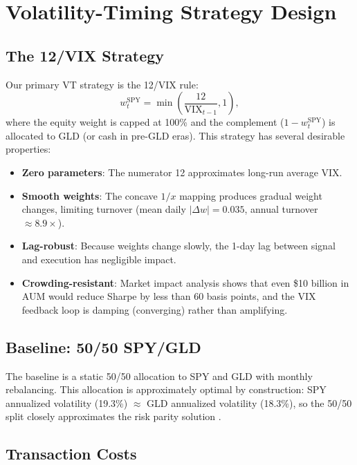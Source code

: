 \documentclass[12pt,a4paper]{article}
\begin{document}
\section{Volatility-Timing Strategy Design}
\label{sec:strategy}

\subsection{The 12/VIX Strategy}

Our primary VT strategy is the 12/VIX rule:
\begin{equation}
w_t^{\text{SPY}} = \min\left(\frac{12}{\text{VIX}_{t-1}}, 1\right),
\label{eq:12vix}
\end{equation}
where the equity weight is capped at 100\% and the complement ($1 - w_t^{\text{SPY}}$) is allocated to GLD (or cash in pre-GLD eras). This strategy has several desirable properties:
\begin{itemize}
    \item \textbf{Zero parameters}: The numerator 12 approximates long-run average VIX.
    \item \textbf{Smooth weights}: The concave $1/x$ mapping produces gradual weight changes, limiting turnover (mean daily $|\Delta w| = 0.035$, annual turnover $\approx 8.9\times$).
    \item \textbf{Lag-robust}: Because weights change slowly, the 1-day lag between signal and execution has negligible impact.
    \item \textbf{Crowding-resistant}: Market impact analysis shows that even \$10 billion in AUM would reduce Sharpe by less than 60 basis points, and the VIX feedback loop is damping (converging) rather than amplifying.
\end{itemize}

\subsection{Baseline: 50/50 SPY/GLD}

The baseline is a static 50/50 allocation to SPY and GLD with monthly rebalancing. This allocation is approximately optimal by construction: SPY annualized volatility (19.3\%) $\approx$ GLD annualized volatility (18.3\%), so the 50/50 split closely approximates the risk parity solution \citep{maillard2010}.

\subsection{Transaction Costs}
\end{document}
